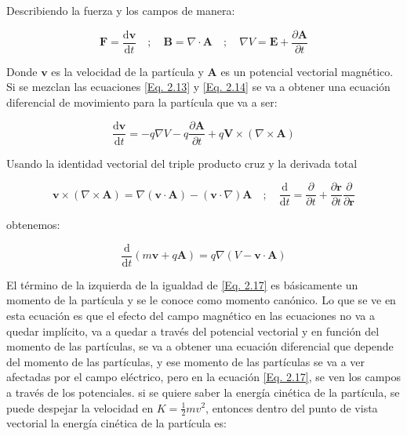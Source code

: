 \documentclass[11pt,fleqn]{book}
\renewcommand{\vec}[1]{\mathbf{#1}}
\begin{document}
Describiendo la fuerza y los campos de manera:

\begin{equation}
    \vec{F}=\frac{\mathrm{d}\vec{v}}{\mathrm{d}t}\quad;\quad\vec{B}=\nabla\cdot\vec{A}\quad;\quad\nabla V=\vec{E}+\frac{\partial\vec{A}}{\partial t}
    \label{Eq. 2.15}
\end{equation}

Donde $\vec{v}$ es la velocidad de la partícula y $\vec{A}$ es un potencial vectorial magnético. Si se mezclan las ecuaciones \ref{Eq. 2.13} y \ref{Eq. 2.14} se va a obtener una ecuación diferencial de movimiento para la partícula que va a ser:

\begin{equation}
    \frac{\mathrm{d}\vec{v}}{\mathrm{d}t}=-q\nabla V-q\frac{\partial\vec{A}}{\partial t}+q\vec{V}\times\left(\nabla\times\vec{A}\right)
    \label{Eq. 2.16}
\end{equation}

Usando la identidad vectorial del triple producto cruz y la derivada total

\begin{equation*}
    \vec{v}\times\left(\nabla\times\vec{A}\right)=\nabla\left(\vec{v}\cdot\vec{A}\right)-\left(\vec{v}\cdot\nabla\right)\vec{A}\quad;\quad\frac{\mathrm{d}}{\mathrm{d}t}=\frac{\partial}{\partial t}+\frac{\partial\vec{r}}{\partial t}\frac{\partial}{\partial\vec{r}}
\end{equation*}

obtenemos:

\begin{equation}
\frac{\mathrm{d}}{\mathrm{d}t}\left(m\vec{v}+q\vec{A}\right)=q\nabla\left(V-\vec{v}\cdot\vec{A}\right)    
\label{Eq. 2.17}
\end{equation}

El término de la izquierda de la igualdad de \ref{Eq. 2.17} es básicamente un momento de la partícula y se le conoce como momento canónico. Lo que se ve en esta ecuación es que el efecto del campo magnético en las ecuaciones no va a quedar implícito, va a quedar a través del potencial vectorial y en función del momento de las partículas, se va a obtener una ecuación diferencial que depende del momento de las partículas, y ese momento de las partículas se va a ver afectadas por el campo eléctrico, pero en la ecuación \ref{Eq. 2.17}, se ven los campos a través de los potenciales. si se quiere saber la energía cinética de la partícula, se puede despejar la velocidad en $K=\frac{1}{2}mv^{2}$, entonces dentro del punto de vista vectorial la energía cinética de la partícula es:
\end{document}
